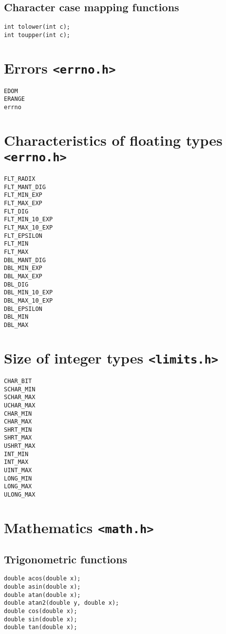 \documentclass[a4paper,11pt,draft]{article}
\begin{document}
\subsection*{Character case mapping functions}

\begin{verbatim}
int tolower(int c);
int toupper(int c);
\end{verbatim}

\section*{Errors {\tt <errno.h>}}

\begin{verbatim}
EDOM
ERANGE
errno
\end{verbatim}

\section*{Characteristics of floating types {\tt <errno.h>}}

\begin{verbatim}
FLT_RADIX
FLT_MANT_DIG
FLT_MIN_EXP
FLT_MAX_EXP
FLT_DIG
FLT_MIN_10_EXP
FLT_MAX_10_EXP
FLT_EPSILON
FLT_MIN
FLT_MAX
DBL_MANT_DIG
DBL_MIN_EXP
DBL_MAX_EXP
DBL_DIG
DBL_MIN_10_EXP
DBL_MAX_10_EXP
DBL_EPSILON
DBL_MIN
DBL_MAX
\end{verbatim}

\section*{Size of integer types {\tt <limits.h>}}

\begin{verbatim}
CHAR_BIT
SCHAR_MIN
SCHAR_MAX
UCHAR_MAX
CHAR_MIN
CHAR_MAX
SHRT_MIN
SHRT_MAX
USHRT_MAX
INT_MIN
INT_MAX
UINT_MAX
LONG_MIN
LONG_MAX
ULONG_MAX
\end{verbatim}

\section*{Mathematics {\tt <math.h>}}

\subsection*{Trigonometric functions}

\begin{verbatim}
double acos(double x);
double asin(double x);
double atan(double x);
double atan2(double y, double x);
double cos(double x);
double sin(double x);
double tan(double x);
\end{verbatim}
\end{document}

